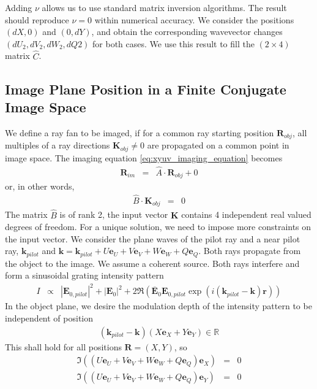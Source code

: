 \documentclass[12pt,a4paper,twoside,openright,BCOR10mm,headsepline,titlepage,abstracton,chapterprefix,final]{scrreprt}
\newcommand\Vector[1]{{\mathbf{#1}}}
\newcommand\Location{\Vector{r}}
\newcommand\wavenumber{k}
\newcommand\Wavevector{\Vector{\wavenumber}}
\newcommand\scalarEfield{E}
\newcommand\Efield{\Vector{\scalarEfield}}
\begin{document}
Adding $\nu$ allows us to use standard matrix inversion algorithms.
The result should reproduce $\nu=0$ within numerical accuracy.
We consider the positions $(dX,0)$ and $(0,dY)$, and obtain the corresponding wavevector changes $(dU_2,dV_2, dW_2, dQ2)$ for both cases.
We use this result to fill the $(2\times4)$ matrix $\hat{C}$.

\subsection{Image Plane Position in a Finite Conjugate Image Space}
We define a ray fan to be imaged, 
if for a common ray starting position $\Vector{R}_{obj}$, all multiples of a
ray directions $\Vector{K}_{obj} \neq 0$ are propagated on a common point in image space.
The imaging equation \eqref{eq:xyuv_imaging_equation} becomes
\begin{eqnarray}
 \Vector{R}_{im} &=& \hat{A} \cdot \Vector{R}_{obj} + 0
\end{eqnarray}
or, in other words,
\begin{eqnarray}
 \hat{B} \cdot \Vector{K}_{obj} &=& 0
\end{eqnarray}
The matrix $\hat{B}$ is of rank 2, the input vector $\Vector{K}$ contains 4 independent real valued degrees of freedom.
For a unique solution, we need to impose more constraints on the input vector. 
We consider the plane waves of the pilot ray and a near pilot ray, 
$\Wavevector_{pilot}$ and 
$\Wavevector = \Wavevector_{pilot} + U \Vector{e}_U + V \Vector{e}_V + W \Vector{e}_W + Q \Vector{e}_Q$.
Both rays propagate from the object to the image.
We assume a coherent source.
Both rays interfere and form a sinusoidal grating intensity pattern
\begin{eqnarray}
 I &\propto& |\Efield_{0,pilot}|^2 + |\Efield_{0}|^2 + 2 \Re \left( \overline{\Efield}_{0}\Efield_{0,pilot} \exp(i(\Wavevector_{pilot} - \Wavevector)\Location) \right)
\end{eqnarray}
In the object plane, we desire the modulation depth of the intensity pattern to be independent of position
\begin{eqnarray}
 (\Wavevector_{pilot} - \Wavevector)(X \Vector{e}_X + Y \Vector{e}_Y) \in \mathbb{R} \label{eq:xyuvRealGratingConstraint}
\end{eqnarray}
This shall hold for all positions $\Vector{R}=(X,Y)$, so
\begin{eqnarray}
 \Im \left( ( U \Vector{e}_U + V \Vector{e}_V + W \Vector{e}_W + Q \Vector{e}_Q ) \Vector{e}_X \right) &=& 0 \\
 \Im \left( ( U \Vector{e}_U + V \Vector{e}_V + W \Vector{e}_W + Q \Vector{e}_Q ) \Vector{e}_Y \right) &=& 0
\end{eqnarray}
\end{document}

